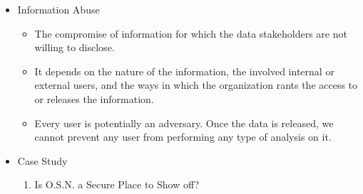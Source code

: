 \documentclass{tikzposter} %
\begin{document}
\begin{columns}
{%
	\begin{itemize}
		\item
		{Information Abuse}
 			 \begin{itemize}
   				 \item The compromise of information for which the data stakeholders are not willing to disclose.
				 \item It depends on the nature of the information, the involved internal or external users, and the ways in which the organization rants the access to or releases the information.
				 \item Every user is potentially an adversary. Once the data is released, we cannot prevent any user from performing any type of analysis on it.
  			\end{itemize}
	
\vspace{.2cm}

\item 
Case Study

\begin{enumerate}
	\item
  	Is O.S.N. a Secure Place to Show off?
	\vspace{.1cm}
	

\end{enumerate}
\end{itemize}}
\end{columns}
\end{document}
